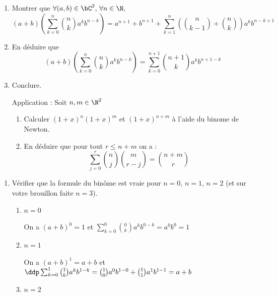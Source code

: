 \begin{correction}
\begin{exercice}
\begin{enumerate}
\item Montrer que $\forall (a,b)\in \bC^2,\,  \forall n \in \N, $
$$(a+b)\left( \sum_{k=0}^n \binom{n}{k}a^k b^{n-k}\right) = a^{n+1}+b^{n+1}+\sum_{k=1}^{n} \left( \binom{n}{k-1}+\binom{n}{k}\right)a^{k} b^{n-k+1}$$

\item En déduire que 
$$(a+b)\left( \sum_{k=0}^n \binom{n}{k}a^k b^{n-k}\right) = \sum_{k=0}^{n+1}  \binom{n+1}{k}a^{k} b^{n+1-k}$$

\item Conclure. 

Application : 
Soit $n,m\in \N^2$ 
\begin{enumerate}
\item Calculer $(1+x)^n(1+x)^m$  et $(1+x)^{n+m}$ à l'aide du binome de Newton. 
\item En déduire que pour tout $r\leq n+m$ on a : 
$$\sum_{j=0}^r  \binom{n}{j} \binom{m}{r-j}=\binom{n+m}{r}$$
\end{enumerate}


\end{enumerate}




\end{exercice}




\begin{correction}



\begin{enumerate}

\item Vérifier que la formule du binôme est vraie pour $n=0$, $n=1$, $n=2$ (et sur votre brouillon faite $n=3$).



\begin{enumerate}
\item $n=0$

On a 
$(a+b)^0 =1$ et 
$\sum_{k=0}^0 \binom{0}{k}a^k b^{0-k} = a^0b^0=1$

\item $n=1$

On a 
$(a+b)^1 =a+b$ et 
$\ddp \sum_{k=0}^1 \binom{1}{k}a^k b^{1-k} = \binom{1}{0}a^0 b^{1-0}+\binom{1}{1}a^1 b^{1-1}= a+b$


\item $n=2$


\end{enumerate}
\end{enumerate}
\end{correction}
\end{correction}
